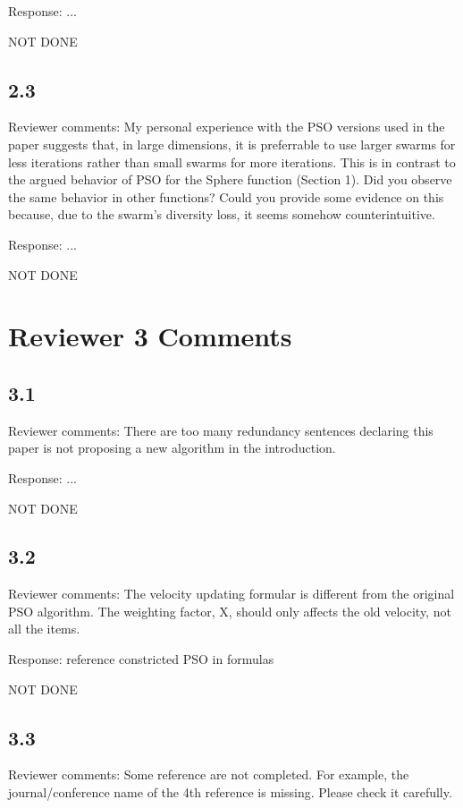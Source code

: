 \documentclass[onecolumn, 12pt]{article}
\begin{document}
Response: ...

NOT DONE

\subsection*{2.3}

Reviewer comments: My personal experience with the PSO versions used in the
paper suggests that, in large dimensions, it is preferrable to use larger
swarms for less iterations rather than small swarms for more iterations. This
is in contrast to the argued behavior of PSO for the Sphere function (Section
1).  Did you observe the same behavior in other functions?  Could you provide
some evidence on this because, due to the swarm's diversity loss, it seems
somehow counterintuitive.

Response: ...

NOT DONE

\section*{Reviewer 3 Comments}

\subsection*{3.1}

Reviewer comments: There are too many redundancy sentences declaring this paper
is not proposing a new algorithm in the introduction.

Response: ...

NOT DONE

\subsection*{3.2}

Reviewer comments: The velocity updating formular is different from the
original PSO algorithm.  The weighting factor, X, should only affects the old
velocity, not all the items.

Response: reference constricted PSO in formulas

NOT DONE

\subsection*{3.3}

Reviewer comments: Some reference are not completed. For example, the
journal/conference name of the 4th reference is missing. Please check it
carefully.
\end{document}
